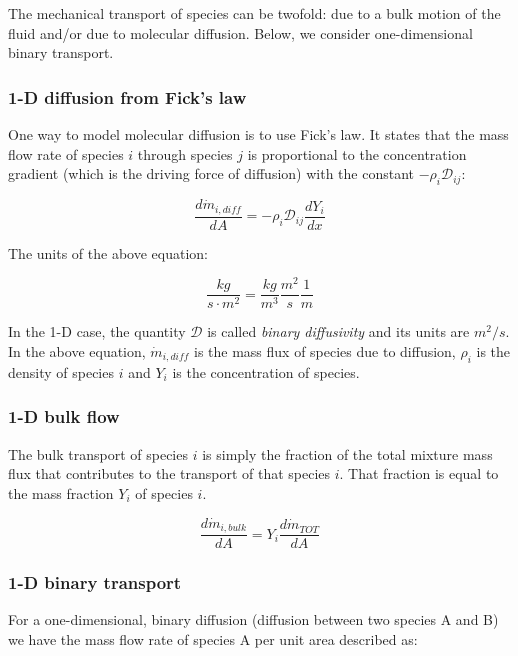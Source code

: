\documentclass[10pt,twocolumn]{article}
\begin{document}
The mechanical transport of species can be twofold: due to a bulk motion of the fluid and/or due to molecular diffusion. Below, we consider one-dimensional binary transport.

\subsubsection{1-D diffusion from Fick's law}

One way to model molecular diffusion is to use Fick's law. It states that the mass flow rate of species $i$ through species $j$ is proportional to the concentration gradient (which is the driving force of diffusion) with the constant $-\rho_i \mathcal{D}_{ij}$:

\begin{equation}
\frac{d \dot{m}_{i, diff}}{dA} = - \rho_i \mathcal{D}_{ij} \frac{d Y_i}{dx}
\end{equation}

The units of the above equation:

\begin{equation*}
\frac{kg}{s \cdot m^2} = \frac{kg}{m^3} \frac{m^2}{s} \frac{1}{m}
\end{equation*}

In the 1-D case, the quantity $\mathcal{D}$ is called \textit{binary diffusivity} and its units are $m^2/s$. In the above equation, $\dot{m}_{i, diff}$ is the mass flux of species due to diffusion, $\rho_i$ is the density of species $i$ and $Y_i$ is the concentration of species.

\subsubsection{1-D bulk flow}

The bulk transport of species $i$ is simply the fraction of the total mixture mass flux that contributes to the transport of that species $i$. That fraction is equal to the mass fraction $Y_i$ of species $i$.

\begin{equation}
\frac{d \dot{m}_{i, bulk}}{dA} = Y_i \frac{d \dot{m}_{TOT}}{d A}
\end{equation}

\subsubsection{1-D binary transport}

For a one-dimensional, binary diffusion (diffusion between two species A and B) we have the mass flow rate of species A per unit area described as:
\end{document}

